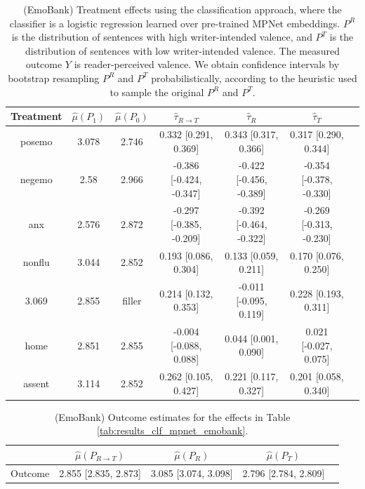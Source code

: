 \documentclass{article}
\begin{document}
\begin{table}[!ht]
\centering
\begin{tabular}{c|cccccc}
\toprule
    Treatment   &   $\hat{\mu}(P_1)$ &   $\hat{\mu}(P_0)$ & $\hat{\tau}_{R \rightarrow T}$   & $\hat{\tau}_R$          & $\hat{\tau}_T$          \\
\midrule
    posemo & 3.078 &              2.746             & 0.332 [0.291, 0.369]             & 0.343 [0.317, 0.366]    & 0.317 [0.290, 0.344]    \\
    negemo & 2.58  &              2.966             & -0.386 [-0.424, -0.347]          & -0.422 [-0.456, -0.389] & -0.354 [-0.378, -0.330] \\
    anx & 2.576 &              2.872                & -0.297 [-0.385, -0.209]          & -0.392 [-0.464, -0.322] & -0.269 [-0.313, -0.230] \\
    nonflu & 3.044 &              2.852             & 0.193 [0.086, 0.304]             & 0.133 [0.059, 0.211]    & 0.170 [0.076, 0.250]    \\
    3.069 &              2.855 & filler             & 0.214 [0.132, 0.353]             & -0.011 [-0.095, 0.119]  & 0.228 [0.193, 0.311]    \\
    home & 2.851 &              2.855              & -0.004 [-0.088, 0.088]           & 0.044 [0.001, 0.090]    & 0.021 [-0.027, 0.075]   \\
    assent & 3.114 &              2.852             & 0.262 [0.105, 0.427]             & 0.221 [0.117, 0.327]    & 0.201 [0.058, 0.340]    \\
\bottomrule
\end{tabular}
\caption{(EmoBank) Treatment effects using the classification approach, where the classifier is a logistic regression learned over pre-trained MPNet embeddings. $P^R$ is the distribution of sentences with high writer-intended valence, and $P^T$ is the distribution of sentences with low writer-intended valence. The measured outcome $Y$ is reader-perceived valence. We obtain confidence intervals by bootstrap resampling $P^R$ and $P^T$ probabilistically, according to the heuristic used to sample the original $P^R$ and $P^T$.}
\label{tab:results_clf_mpnet_emobank_boot}
\end{table}

\begin{table}[!ht]
\centering
\begin{tabular}{c|cccc}
\toprule
    & $\hat{\mu}(P_{R \rightarrow T})$   & $\hat{\mu}(P_R)$     & $\hat{\mu}(P_T)$     \\
\midrule
    Outcome & 2.855 [2.835, 2.873]               & 3.085 [3.074, 3.098] & 2.796 [2.784, 2.809] \\
\bottomrule
\end{tabular}
\caption{(EmoBank) Outcome estimates for the effects in Table \ref{tab:results_clf_mpnet_emobank}.}
\label{tab:results_clf_mpnet_emobank_boot_outcome}
\end{table}
\end{document}
